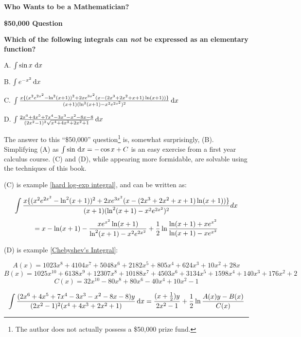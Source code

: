 

\vskip 0.5in

\centerline{\Huge\bf Who Wants to be a Mathematician?}

\vskip 0.5in
\centerline{\Huge\bf \$50,000 Question}

\vskip 0.5in
\begin{center}
{\LARGE\bf Which of the following integrals can {\it not} be expressed as an elementary function?}
\end{center}

\begin{center}
{\Huge A. $\int \sin x \, \,\mathrm{d} x$}

\vskip 12pt
{\Huge B. $\int e^{-x^2} \,\mathrm{d} x$}

\vskip 12pt
{\Huge C.}\,\,{\huge $\int{{x\{(x^2e^{2x^2}-\ln^2(x+1))^2+2xe^{3x^2}(x-(2x^3+2x^2+x+1)\ln(x+1))\}}\over{(x+1)(\ln^2(x+1) - x^2e^{2x^2})^2}} \,\mathrm{d} x$}

\vskip 12pt
{\Huge D. $\int {{2x^6+4x^5+7x^4-3x^3-x^2-8x-8}\over{(2x^2-1)^2\sqrt{x^4+4 x^3+2 x^2+1}}} \,\mathrm{d} x$}

\end{center}

\vfill\eject

The answer to this ``\$50,000'' question\footnote{The author does not actually possess
a \$50,000 prize fund.} is, somewhat surprisingly,
(B).  Simplifying (A) as $\int \sin \,\mathrm{d} x = -\cos x + C$ is an easy exercise from
a first year calculus course.  (C) and (D), while appearing
more formidable, are solvable using the techniques of this book.

(C) is example
\ref{hard log-exp integral}, and can be written as:

$$\int{{x\{(x^2e^{2x^2}-\ln^2(x+1))^2+2xe^{3x^2}(x-(2x^3+2x^2+x+1)\ln(x+1))\}}\over{(x+1)(\ln^2(x+1) - x^2e^{2x^2})^2}} dx$$
$$= x - \ln(x+1) - {x e^{x^2}\ln(x+1)\over{\ln^2(x+1)-x^2 e^{2x^2}}}
+ {1\over2}\ln\frac{\ln(x+1) + x e^{x^2}}{\ln(x+1) - x e^{x^2}}$$

(D) is example \ref{Chebyshev's Integral}:

$$A(x) = 1023x^8+4104x^7+5048x^6+2182x^5+805x^4+624x^3+10x^2+28x$$
$$B(x) = 1025x^{10} + 6138x^9 + 12307x^8 + 10188x^7 + 4503x^6 + 3134x^5 + 1598x^4 + 140x^3 + 176x^2 +2$$
$$C(x) = 32x^{10}-80x^8+80x^6-40x^4+10x^2-1$$

$$\int {{(2x^6+4x^5+7x^4-3x^3-x^2-8x-8)y}\over{(2x^2-1)^2(x^4+4 x^3+2 x^2+1)}} \,{\rm d}x
= {{(x+{1\over2})y}\over{2x^2-1}} + {1\over2}\ln{{A(x)y - B(x)}\over{C(x)}}
$$

